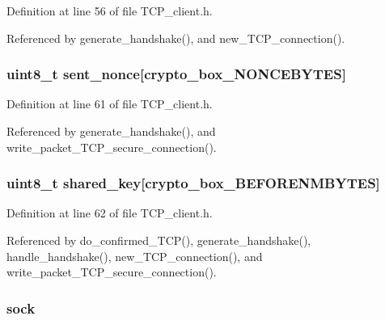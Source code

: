 Definition at line 56 of file T\+C\+P\+\_\+client.\+h.



Referenced by generate\+\_\+handshake(), and new\+\_\+\+T\+C\+P\+\_\+connection().

\hypertarget{struct_t_c_p___client___connection_a9df0e00e8f493ed6cd1ff45e7da33c0d}{
\subsubsection[{sent\+\_\+nonce}]{\setlength{\rightskip}{0pt plus 5cm}uint8\+\_\+t sent\+\_\+nonce\mbox{[}crypto\+\_\+box\+\_\+\+N\+O\+N\+C\+E\+B\+Y\+T\+E\+S\mbox{]}}}\label{struct_t_c_p___client___connection_a9df0e00e8f493ed6cd1ff45e7da33c0d}


Definition at line 61 of file T\+C\+P\+\_\+client.\+h.



Referenced by generate\+\_\+handshake(), and write\+\_\+packet\+\_\+\+T\+C\+P\+\_\+secure\+\_\+connection().

\hypertarget{struct_t_c_p___client___connection_a81ead9fac55a0cedc30a96253a2c5119}{
\subsubsection[{shared\+\_\+key}]{\setlength{\rightskip}{0pt plus 5cm}uint8\+\_\+t shared\+\_\+key\mbox{[}crypto\+\_\+box\+\_\+\+B\+E\+F\+O\+R\+E\+N\+M\+B\+Y\+T\+E\+S\mbox{]}}}\label{struct_t_c_p___client___connection_a81ead9fac55a0cedc30a96253a2c5119}


Definition at line 62 of file T\+C\+P\+\_\+client.\+h.



Referenced by do\+\_\+confirmed\+\_\+\+T\+C\+P(), generate\+\_\+handshake(), handle\+\_\+handshake(), new\+\_\+\+T\+C\+P\+\_\+connection(), and write\+\_\+packet\+\_\+\+T\+C\+P\+\_\+secure\+\_\+connection().

\hypertarget{struct_t_c_p___client___connection_a35b19d84fb632ca8ce5cab237f7089a5}{
\subsubsection[{sock}]{ sock}}\label{struct_t_c_p___client___connection_a35b19d84fb632ca8ce5cab237f7089a5}


